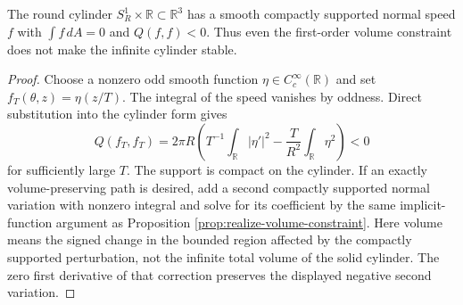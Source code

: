 \begin{example}\label{ex:infinite-cylinder-volume-instability}
The round cylinder $S_R^1\times\mathbb R\subset\mathbb R^3$ has a smooth compactly supported normal speed $f$ with $\int f\,dA=0$ and $Q(f,f)<0$. Thus even the first-order volume constraint does not make the infinite cylinder stable.
\end{example}
\begin{proof}
Choose a nonzero odd smooth function $\eta\in C_c^\infty(\mathbb R)$ and set $f_T(\theta,z)=\eta(z/T)$. The integral of the speed vanishes by oddness. Direct substitution into the cylinder form gives
\[
 Q(f_T,f_T)=2\pi R\left(T^{-1}\int_{\mathbb R}|\eta'|^2
               -\frac T{R^2}\int_{\mathbb R}\eta^2\right)<0
\]
for sufficiently large $T$. The support is compact on the cylinder. If an exactly volume-preserving path is desired, add a second compactly supported normal variation with nonzero integral and solve for its coefficient by the same implicit-function argument as Proposition \ref{prop:realize-volume-constraint}. Here volume means the signed change in the bounded region affected by the compactly supported perturbation, not the infinite total volume of the solid cylinder. The zero first derivative of that correction preserves the displayed negative second variation.
\end{proof}
